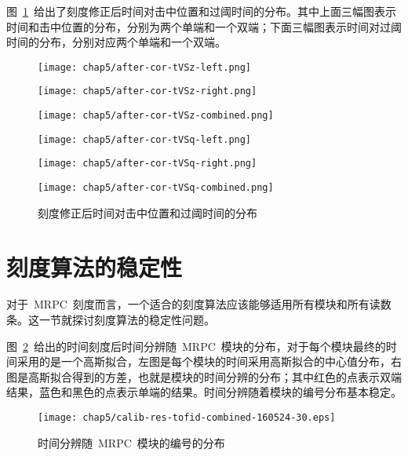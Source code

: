 图~\ref{fig:after-Calibration}~给出了刻度修正后时间对击中位置和过阈时间的分布。其中上面三幅图表示时间和击中位置的分布，分别为两个单端和一个双端；下面三幅图表示时间对过阈时间的分布，分别对应两个单端和一个双端。
\begin{figure}[htbp]
\begin{minipage}[t]{0.33\linewidth}
\centering
\texttt{[image: chap5/after-cor-tVSz-left.png]}
\label{fig:after-cor-tVSz-left}
\end{minipage}%
\hfill
\begin{minipage}[t]{0.33\linewidth}
\centering
\texttt{[image: chap5/after-cor-tVSz-right.png]}
\label{fig:after-cor-tVSz-right}
\end{minipage}
\hfill
\begin{minipage}[t]{0.33\linewidth}
\centering
\texttt{[image: chap5/after-cor-tVSz-combined.png]}
\label{fig:after-cor-tVSz-combined}
\end{minipage}
\vfill
\begin{minipage}[t]{0.33\linewidth}
\centering
\texttt{[image: chap5/after-cor-tVSq-left.png]}
\label{fig:after-cor-tVSq-left}
\end{minipage}%
\hfill
\begin{minipage}[t]{0.33\linewidth}
\centering
\texttt{[image: chap5/after-cor-tVSq-right.png]}
\label{fig:after-cor-tVSq-right}
\end{minipage}
\hfill
\begin{minipage}[t]{0.33\linewidth}
\centering
\texttt{[image: chap5/after-cor-tVSq-combined.png]}
\label{fig:after-cor-tVSq-combined}
\end{minipage}
\caption{刻度修正后时间对击中位置和过阈时间的分布}
\label{fig:after-Calibration}
\end{figure}

\section{刻度算法的稳定性}
对于~MRPC~刻度而言，一个适合的刻度算法应该能够适用所有模块和所有读数条。这一节就探讨刻度算法的稳定性问题。

图~\ref{fig:calib-res-tofid-combined-160524-30}~给出的时间刻度后时间分辨随~MRPC~模块的分布，对于每个模块最终的时间采用的是一个高斯拟合，左图是每个模块的时间采用高斯拟合的中心值分布，右图是高斯拟合得到的方差，也就是模块的时间分辨的分布；其中红色的点表示双端结果，蓝色和黑色的点表示单端的结果。时间分辨随着模块的编号分布基本稳定。
\begin{figure}[!h]
\centering
\texttt{[image: chap5/calib-res-tofid-combined-160524-30.eps]}
\caption{时间分辨随~MRPC~模块的编号的分布}
\label{fig:calib-res-tofid-combined-160524-30}
\end{figure}

